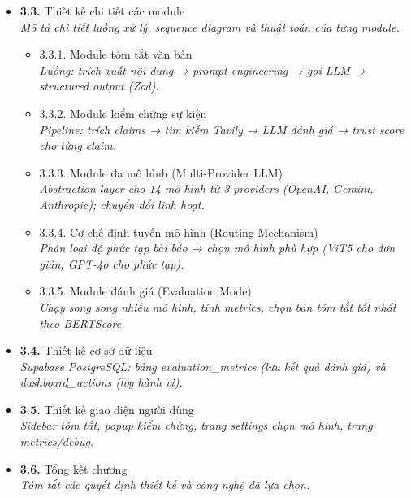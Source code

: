 \documentclass[a4paper,12pt]{article}
\begin{document}
\begin{itemize}[leftmargin=1cm, labelsep=0.3cm, itemsep=1pt, label={}]
  \item \textbf{3.3.} Thiết kế chi tiết các module \\
  {\small\itshape Mô tả chi tiết luồng xử lý, sequence diagram và thuật toán của từng module.}
  \begin{itemize}[leftmargin=1cm, itemsep=0pt, label={}]
    \item 3.3.1. Module tóm tắt văn bản \\
      {\small\itshape Luồng: trích xuất nội dung → prompt engineering → gọi LLM → structured output (Zod).}
    \item 3.3.2. Module kiểm chứng sự kiện \\
      {\small\itshape Pipeline: trích claims → tìm kiếm Tavily → LLM đánh giá → trust score cho từng claim.}
    \item 3.3.3. Module đa mô hình (Multi-Provider LLM) \\
      {\small\itshape Abstraction layer cho 14 mô hình từ 3 providers (OpenAI, Gemini, Anthropic); chuyển đổi linh hoạt.}
    \item 3.3.4. Cơ chế định tuyến mô hình (Routing Mechanism) \\
      {\small\itshape Phân loại độ phức tạp bài báo → chọn mô hình phù hợp (ViT5 cho đơn giản, GPT-4o cho phức tạp).}
    \item 3.3.5. Module đánh giá (Evaluation Mode) \\
      {\small\itshape Chạy song song nhiều mô hình, tính metrics, chọn bản tóm tắt tốt nhất theo BERTScore.}
  \end{itemize}

  \item \textbf{3.4.} Thiết kế cơ sở dữ liệu \\
  {\small\itshape Supabase PostgreSQL: bảng evaluation\_metrics (lưu kết quả đánh giá) và dashboard\_actions (log hành vi).}

  \item \textbf{3.5.} Thiết kế giao diện người dùng \\
  {\small\itshape Sidebar tóm tắt, popup kiểm chứng, trang settings chọn mô hình, trang metrics/debug.}

  \item \textbf{3.6.} Tổng kết chương \\
  {\small\itshape Tóm tắt các quyết định thiết kế và công nghệ đã lựa chọn.}
\end{itemize}

\vspace{0.5cm}
\end{document}
